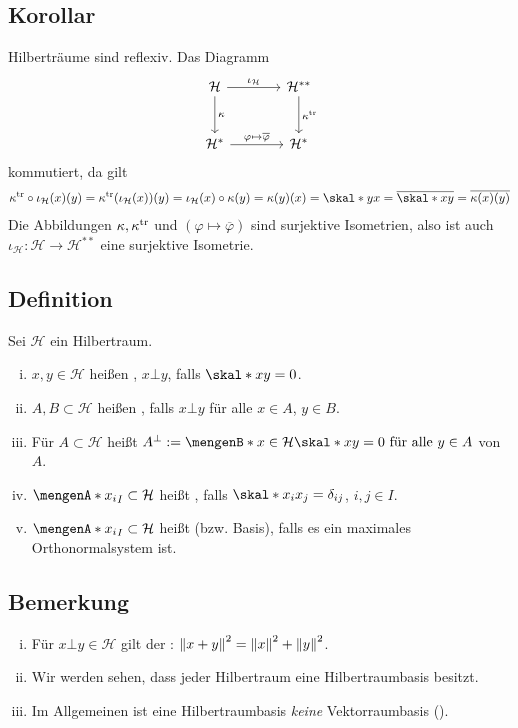 \subsection{Korollar} %
\label{sub:712}
Hilberträume sind reflexiv.
Das Diagramm
\[
	\begin{tikzcd}[row sep=large, column sep=large]
		\mathcal{H} \rar["\iota_{\mathcal{H}}"] \dar["\kappa"] & \mathcal{H}^{**} \dar["\kappa^\tr"]\\
		\mathcal{H}^* \rar["\varphi \mapsto \overline{\varphi}"] & \mathcal{H}^*
	\end{tikzcd}
\]
kommutiert, da gilt
\begin{align*}
	\kappa^\tr \circ \iota_{\mathcal{H}}(x)(y) = \kappa^\tr \enbrace*{\iota_{\mathcal{H}}(x)}(y)  =\iota_{\mathcal{H}}(x) \circ \kappa (y) 
	= \kappa(y)(x) = \skal*{y}{x} = \overline{\skal*{x}{y}} = \overline{\kappa(x)(y)} 
\end{align*}
Die Abbildungen $\kappa, \kappa^{\mathrm{tr}}$ und $(\varphi \mapsto \overline{\varphi})$ sind surjektive Isometrien, also ist auch 
$\iota_{\mathcal{H}} \colon \mathcal{H} \to \mathcal{H}^{**}$ eine surjektive Isometrie.\bewende

\subsection[Definition: Orthogonal, Orthonormalsystem und Hilbertraumbasis]{Definition} %
\label{sub:713}
Sei $\mathcal{H}$ ein Hilbertraum.
\begin{enumerate}[(i)]
	\item $x,y \in \mathcal{H}$ heißen , $x\bot y$, falls $\skal*{x}{y}=0$.
	\item $A,B  \subset \mathcal{H}$ heißen , falls $x \bot y$ für alle $x \in A$, $y \in B$. 
	\item Für $A \subset \mathcal{H}$ heißt $A^\bot := \set[x \in \mathcal{H}]{\skal*{x}{y}=0 \text{ für alle } y \in A}$  von $A$.
	\item $\set{x_i}_{I} \subset \mathcal{H}$ heißt , falls $\skal*{x_i}{x_j}= \delta_{ij}$, $i,j \in I$.
	\item $\set{x_i}_{I} \subset \mathcal{H}$ heißt  (bzw. Basis), falls es ein maximales Orthonormalsystem ist. 
\end{enumerate}

\subsection{Bemerkung} %
\label{sub:714}
\begin{enumerate}[(i)]
	\item Für $x \bot y \in \mathcal{H}$ gilt der : $\norm{x+y}^2 = \norm{x}^2  + \norm{y}^2$.
	\item Wir werden sehen, dass jeder Hilbertraum eine Hilbertraumbasis besitzt.
	\item Im Allgemeinen ist eine Hilbertraumbasis \emph{keine} Vektorraumbasis ().
\end{enumerate}

